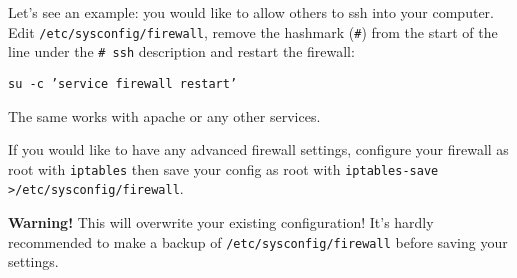 Let's see an example: you would like to allow others to ssh into your computer. Edit {\tt /etc/sysconfig/firewall}, remove the hashmark ({\tt #}) from the start of the line under the {\tt # ssh} description and restart the firewall:

{\tt su -c 'service firewall restart'}

The same works with apache or any other services.

If you would like to have any advanced firewall settings, configure your firewall as root with {\tt iptables} then save your config as root with {\tt iptables-save >/etc/sysconfig/firewall}.

\textbf{Warning!} This will overwrite your existing configuration! It's hardly recommended to make a backup of {\tt /etc/sysconfig/firewall} before saving your settings.

